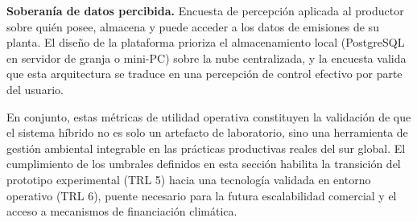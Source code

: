 \textbf{Soberanía de datos percibida.} Encuesta de percepción aplicada al productor sobre quién posee, almacena y puede acceder a los datos de emisiones de su planta. El diseño de la plataforma prioriza el almacenamiento local (PostgreSQL en servidor de granja o mini-PC) sobre la nube centralizada, y la encuesta valida que esta arquitectura se traduce en una percepción de control efectivo por parte del usuario.

En conjunto, estas métricas de utilidad operativa constituyen la validación de que el sistema híbrido no es solo un artefacto de laboratorio, sino una herramienta de gestión ambiental integrable en las prácticas productivas reales del sur global. El cumplimiento de los umbrales definidos en esta sección habilita la transición del prototipo experimental (TRL 5) hacia una tecnología validada en entorno operativo (TRL 6), puente necesario para la futura escalabilidad comercial y el acceso a mecanismos de financiación climática.
